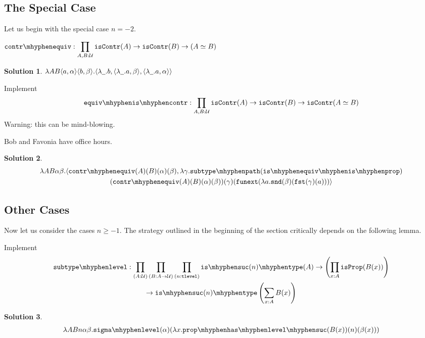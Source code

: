 \documentclass[12pt]{article}
\newcommand{\cut}[1]{}
\newcommand{\marksolution}[1]{\color{FireBrick}#1\normalcolor}%
\newcommand{\marksolution}[1]{\cut{#1}}%
\theoremstyle{plain}
\newtheorem*{solution}{Solution}
\begin{document}
\subsection{The Special Case}

Let us begin with the special case $n = -2$.
\begin{task}
  $\displaystyle
  \contrequiv :
  \prod_{A,B:\U}
  \iscontr(A) \to
  \iscontr(B) \to
  (A \eqv B)
  $
\end{task}
\marksolution{
  \begin{solution}
    $
    \lambda AB\langle a,\alpha\rangle \langle b,\beta\rangle.\langle \lambda\underline{\hspace{0.5em}}.b,
      \langle \lambda\underline{\hspace{0.5em}}.a,\beta\rangle
    ,
      \langle \lambda\underline{\hspace{0.5em}}.a,\alpha\rangle
    \rangle
    $
  \end{solution}
}
\begin{task} Implement
  \[
    \equiviscontr :
    \prod_{A,B:\U}
    \iscontr(A) \to \iscontr(B) \to \iscontr(A \eqv B)
  \]
  Warning: this can be mind-blowing.
  \begin{hint}
    Bob and Favonia have office hours.
  \end{hint}
\end{task}
\marksolution{
  \begin{solution}
    \begin{multline*}
      \lambda AB\alpha\beta.\pair{
        \contrequiv(A)(B)(\alpha)(\beta)
      }{
        \lambda \gamma.\subtypepath(\isequivisprop)
        \\
        (\contrequiv(A)(B)(\alpha)(\beta))
      (\gamma)(\funext(\lambda a.\snd(\beta)(\fst(\gamma)(a)))}
    \end{multline*}
  \end{solution}
}

\subsection{Other Cases}

Now let us consider the cases $n \geq -1$.
The strategy outlined in the beginning of the section critically depends on the following lemma.
\begin{task} Implement
  \begin{multline*}
    \subtypelevel :
    \prod_{(A:\U)}
    \prod_{(B:A\to\U)}
    \prod_{(n:\tlevel)}
    \istype{\suc(n)}(A)
    \to
    \left(\prod_{x:A} \isprop(B(x))\right)
    \\
    \to
    \istype{\suc(n)}\left(\sum_{x:A}B(x)\right)
  \end{multline*}
\end{task}
\marksolution{
  \begin{solution}
    \begin{multline*}
      \lambda A B n \alpha \beta.\sigmalevel(\alpha)(\lambda x.\prophaslevelsuc(B(x))(n)(\beta(x)))
    \end{multline*}
  \end{solution}
}
\end{document}
